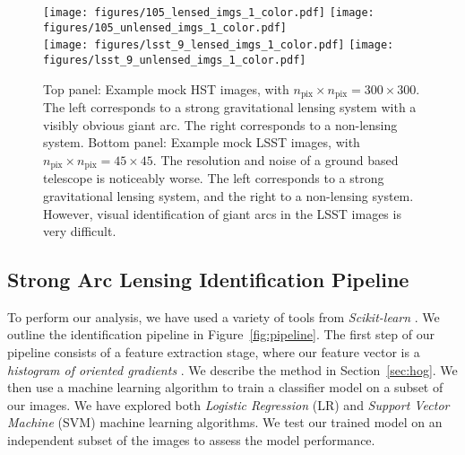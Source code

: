 \documentclass{emulateapj}
\begin{document}
\begin{figure*}[t]\label{fig:mockimages}
\begin{center}
\texttt{[image: figures/105\_lensed\_imgs\_1\_color.pdf]}\hspace{-20pt}
\texttt{[image: figures/105\_unlensed\_imgs\_1\_color.pdf]}\\
\texttt{[image: figures/lsst\_9\_lensed\_imgs\_1\_color.pdf]}\hspace{-20pt}
\texttt{[image: figures/lsst\_9\_unlensed\_imgs\_1\_color.pdf]}
\caption{Top panel: Example mock HST images, with $n_\text{pix}\times
  n_\text{pix}=300\times300$.  The left corresponds to a strong
  gravitational lensing system with a visibly obvious giant arc.  The
  right corresponds to a non-lensing system.  Bottom panel: Example
  mock LSST images, with $n_\text{pix}\times n_\text{pix}=45\times45$.
  The resolution and noise of a ground based telescope is noticeably
  worse.  The left corresponds to a strong gravitational lensing
  system, and the right to a non-lensing system.  However, visual
  identification of giant arcs in the LSST images is very difficult.}
\end{center}
\end{figure*}

\subsection{Strong Arc Lensing Identification Pipeline}

To perform our analysis, we have used a variety of tools from {\em
  Scikit-learn} \citep{pedregosa_etal12}.  We outline the
identification pipeline in Figure~\ref{fig:pipeline}.  The first step
of our pipeline consists of a feature extraction stage, where our
feature vector is a {\em histogram of oriented gradients}
\citep{dalalandtriggs_05}.  We describe the method in
Section~\ref{sec:hog}.  We then use a machine learning algorithm to
train a classifier model on a subset of our images.  We have explored
both {\em Logistic Regression} (LR) and {\em Support Vector Machine}
(SVM) machine learning algorithms.  We test our trained model on an
independent subset of the images to assess the model performance.
\end{document}
